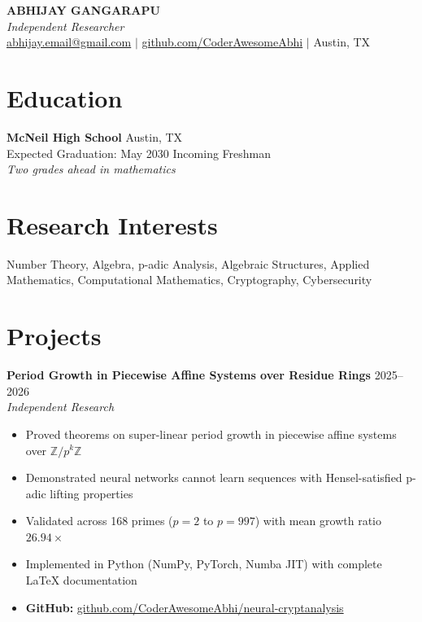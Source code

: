 \documentclass[11pt,letterpaper]{article}
\begin{document}
\begin{center}
{\LARGE \textbf{ABHIJAY GANGARAPU}}\\[4pt]
\textit{Independent Researcher}\\[4pt]
\href{mailto:abhijay.email@gmail.com}{abhijay.email@gmail.com} $\mid$
\href{https://github.com/CoderAwesomeAbhi}{github.com/CoderAwesomeAbhi} $\mid$
Austin, TX
\end{center}

\section{Education}

\textbf{McNeil High School} \hfill Austin, TX\\
Expected Graduation: May 2030 \hfill Incoming Freshman\\
\textit{Two grades ahead in mathematics}

\section{Research Interests}

Number Theory, Algebra, p-adic Analysis, Algebraic Structures, Applied Mathematics, Computational Mathematics, Cryptography, Cybersecurity

\section{Projects}

\textbf{Period Growth in Piecewise Affine Systems over Residue Rings} \hfill 2025--2026\\
\textit{Independent Research}
\begin{itemize}[leftmargin=1.5em,itemsep=2pt]
\item Proved theorems on super-linear period growth in piecewise affine systems over $\mathbb{Z}/p^k\mathbb{Z}$
\item Demonstrated neural networks cannot learn sequences with Hensel-satisfied p-adic lifting properties
\item Validated across 168 primes ($p = 2$ to $p = 997$) with mean growth ratio $26.94\times$
\item Implemented in Python (NumPy, PyTorch, Numba JIT) with complete LaTeX documentation
\item \textbf{GitHub:} \href{https://github.com/CoderAwesomeAbhi/neural-cryptanalysis}{github.com/CoderAwesomeAbhi/neural-cryptanalysis}
\end{itemize}
\end{document}
